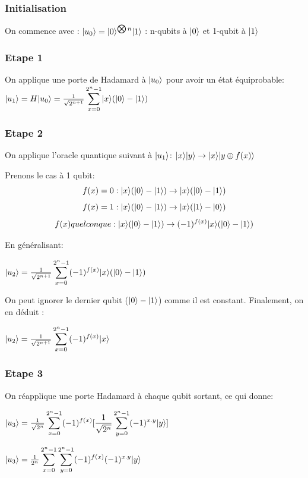 \documentclass[12pt,a4paper]{article}
\DeclarePairedDelimiter\ket{\lvert}{\rangle}
\begin{document}
\subsubsection{Initialisation}
On commence avec :
$\ket{u_0} = \ket{0}^{\bigotimes n}\ket{1}$
: n-qubits à $\ket{0}$ et 1-qubit à $\ket{1}$

\subsubsection{Etape 1}

On applique une porte de Hadamard à $\ket{u_0}$ pour avoir un état équiprobable:
$\ket{u_1} = H\ket{u_0} = \frac{1}{\sqrt{2^{n + 1}}}
\displaystyle\sum_{x=0}^{2^n-1} \ket{x}(\ket{0} - \ket{1})$

\subsubsection{Etape 2}
On applique l'oracle quantique suivant à $\ket{u_1}$: $\ket{x}\ket{y}\rightarrow\ket{x}\ket{y\oplus f(x)}$

Prenons le cas à 1 qubit:
\[
f(x) = 0: \ket{x}(\ket{0} - \ket{1}) \rightarrow \ket{x}(\ket{0} - \ket{1})
\]
\[
f(x) = 1: \ket{x}(\ket{0} - \ket{1}) \rightarrow \ket{x}(\ket{1} - \ket{0})
\]
\[
f(x) quelconque: \ket{x}(\ket{0} - \ket{1}) \rightarrow (-1)^{f(x)}\ket{x}(\ket{0} - \ket{1})
\]

En généralisant:

$\ket{u_2} = \frac{1}{\sqrt{2^{n + 1}}}
\displaystyle\sum_{x=0}^{2^n-1} (-1)^{f(x)}\ket{x}(\ket{0} - \ket{1})$

On peut ignorer le dernier qubit ($\ket{0} - \ket{1}$) comme il est
constant. Finalement, on en déduit :

$\ket{u_2} = \frac{1}{\sqrt{2^{n + 1}}}
\displaystyle\sum_{x=0}^{2^n-1} (-1)^{f(x)}\ket{x}$

\subsubsection{Etape 3}
On réapplique une porte Hadamard à chaque qubit sortant, ce qui donne:

$\ket{u_3} = \frac{1}{\sqrt{2^{n}}}
\displaystyle\sum_{x=0}^{2^n-1} (-1)^{f(x)} [\frac{1}{\sqrt{2^{n}}} \displaystyle\sum_{y=0}^{2^n-1} (-1)^{x.y}\ket{y} ]$

$\ket{u_3} = \frac{1}{2^{n}}
\displaystyle\sum_{x=0}^{2^n-1} \displaystyle\sum_{y=0}^{2^n-1}(-1)^{f(x)} (-1)^{x.y}\ket{y}$
\end{document}
